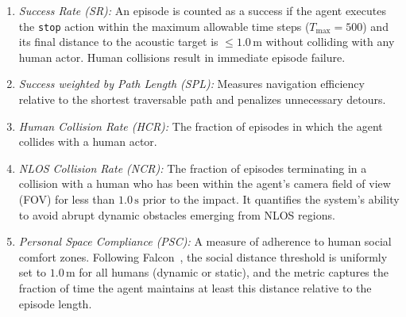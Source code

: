 \begin{enumerate}
	\item \textit{Success Rate (SR):} An episode is counted as a success if the agent executes the \texttt{stop} action within the maximum allowable time steps ($T_{\mathrm{max}}=500$) and its final distance to the acoustic target is $\le 1.0\,\mathrm{m}$ without colliding with any human actor. Human collisions result in immediate episode failure.
	\item \textit{Success weighted by Path Length (SPL):} Measures navigation efficiency relative to the shortest traversable path and penalizes unnecessary detours.
	\item \textit{Human Collision Rate (HCR):} The fraction of episodes in which the agent collides with a human actor.
	\item \textit{NLOS Collision Rate (NCR):} The fraction of episodes terminating in a collision with a human who has been within the agent's camera field of view (FOV) for less than $1.0\,\mathrm{s}$ prior to the impact. It quantifies the system's ability to avoid abrupt dynamic obstacles emerging from NLOS regions.
	\item \textit{Personal Space Compliance (PSC):} A measure of adherence to human social comfort zones. Following Falcon~\cite{CognitionPrecognitionFutureaware2025}, the social distance threshold is uniformly set to $1.0\,\mathrm{m}$ for all humans (dynamic or static), and the metric captures the fraction of time the agent maintains at least this distance relative to the episode length.
\end{enumerate}



